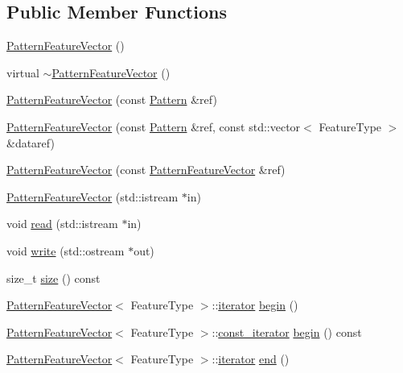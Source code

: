 \subsection*{Public Member Functions}
\begin{DoxyCompactItemize}
\item 
\hyperlink{classPatternFeatureVector_ad99d4a05d82fcf345432dff0b28306f0}{Pattern\+Feature\+Vector} ()
\item 
virtual \hyperlink{classPatternFeatureVector_a28391cd22ee11edf557e0f4c51df3f5b}{$\sim$\+Pattern\+Feature\+Vector} ()
\item 
\hyperlink{classPatternFeatureVector_a984df156b0fbf3a0a11bc1e57bea24a3}{Pattern\+Feature\+Vector} (const \hyperlink{classPattern}{Pattern} \&ref)
\item 
\hyperlink{classPatternFeatureVector_a7f6948af69865125ead89fa3ee3c83eb}{Pattern\+Feature\+Vector} (const \hyperlink{classPattern}{Pattern} \&ref, const std\+::vector$<$ Feature\+Type $>$ \&dataref)
\item 
\hyperlink{classPatternFeatureVector_a941dcf7305fb15d06ccd7c32690bc025}{Pattern\+Feature\+Vector} (const \hyperlink{classPatternFeatureVector}{Pattern\+Feature\+Vector} \&ref)
\item 
\hyperlink{classPatternFeatureVector_a2ce1bdcf182b806bd3e06e5c412221b4}{Pattern\+Feature\+Vector} (std\+::istream $\ast$in)
\item 
void \hyperlink{classPatternFeatureVector_a874b73d43566d1514404f9d8f1e7dd91}{read} (std\+::istream $\ast$in)
\item 
void \hyperlink{classPatternFeatureVector_ae315b88a17a31d7c79615c8cf17f2a6a}{write} (std\+::ostream $\ast$out)
\item 
size\+\_\+t \hyperlink{classPatternFeatureVector_ad99cf7876fda7bf9d7d41c8f0648df80}{size} () const 
\item 
\hyperlink{classPatternFeatureVector}{Pattern\+Feature\+Vector}$<$ Feature\+Type $>$\+::\hyperlink{classPatternFeatureVector_a4a2652f25b1f733630a6d1b8479fce77}{iterator} \hyperlink{classPatternFeatureVector_a56aff729865bfeff35d2e2850cca18fe}{begin} ()
\item 
\hyperlink{classPatternFeatureVector}{Pattern\+Feature\+Vector}$<$ Feature\+Type $>$\+::\hyperlink{classPatternFeatureVector_a8fae8bc79a755c241964080a684cfd43}{const\+\_\+iterator} \hyperlink{classPatternFeatureVector_a1e09020a733965118aab5f386f32ef4f}{begin} () const 
\item 
\hyperlink{classPatternFeatureVector}{Pattern\+Feature\+Vector}$<$ Feature\+Type $>$\+::\hyperlink{classPatternFeatureVector_a4a2652f25b1f733630a6d1b8479fce77}{iterator} \hyperlink{classPatternFeatureVector_acedcc928b3de5e2c66498f0c44bf7cc2}{end} ()

\end{DoxyCompactItemize}
